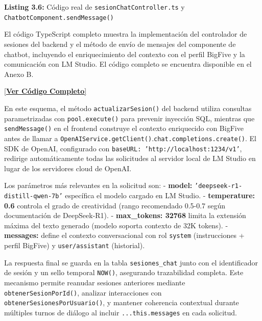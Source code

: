 \documentclass[12pt,a4paper]{report}
\numberwithin{figure}{section}
\begin{document}
\vspace{0.7em}
\label{lst:backend-controller-ref}
\noindent\textbf{Listing 3.6:} Código real de \texttt{sesionChatController.ts} y \texttt{ChatbotComponent.sendMessage()}

\noindent El código TypeScript completo muestra la implementación del controlador de sesiones del backend y el método de envío de mensajes del componente de chatbot, incluyendo el enriquecimiento del contexto con el perfil BigFive y la comunicación con LM Studio. El código completo se encuentra disponible en el Anexo B.

\begin{center}
\hyperref[lst:backend-controller-code]{[\textbf{Ver Código Completo}]}
\end{center}

\vspace{0.5em}

En este esquema, el método \texttt{actualizarSesion()} del backend utiliza consultas parametrizadas con \texttt{pool.execute()} para prevenir inyección SQL, mientras que \texttt{sendMessage()} en el frontend construye el contexto enriquecido con BigFive antes de llamar a \texttt{OpenAIService.getClient()}.\allowbreak\texttt{chat.completions.create()}.  
El SDK de OpenAI, configurado con \texttt{baseURL: 'http://localhost:1234/v1'}, redirige automáticamente todas las solicitudes al servidor local de LM Studio en lugar de los servidores cloud de OpenAI.

Los parámetros más relevantes en la solicitud son:
- \textbf{model:} \texttt{'deepseek-r1-distill-qwen-7b'} específica el modelo cargado en LM Studio.
- \textbf{temperature: 0.6} controla el grado de creatividad (rango recomendado 0.5-0.7 según documentación de DeepSeek-R1).  
- \textbf{max\_tokens: 32768} limita la extensión máxima del texto generado (modelo soporta contexto de 32K tokens).  
- \textbf{messages:} define el contexto conversacional con rol \texttt{system} (instrucciones + perfil BigFive) y \texttt{user/assistant} (historial).

La respuesta final se guarda en la tabla \texttt{sesiones\_chat} junto con el identificador de sesión y un sello temporal \texttt{NOW()}, asegurando trazabilidad completa.  
Este mecanismo permite reanudar sesiones anteriores mediante \texttt{obtenerSesionPorId()}, analizar interacciones con \texttt{obtenerSesionesPorUsuario()}, y mantener coherencia contextual durante múltiples turnos de diálogo al incluir \texttt{...this.messages} en cada solicitud.
\end{document}
